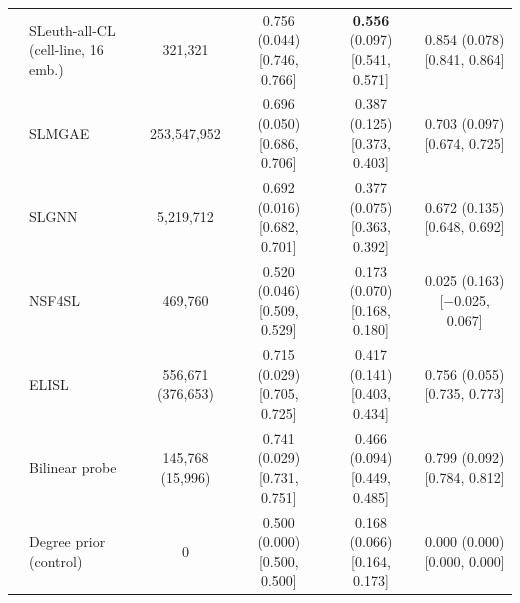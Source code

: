 \begin{tabular}{ll|cccc}
 & SLeuth-all-CL (cell-line, 16 emb.) & 321{,}321 & 0.756 (0.044) {\scriptsize [0.746, 0.766]} & \textbf{0.556} (0.097) {\scriptsize [0.541, 0.571]} & 0.854 (0.078) {\scriptsize [0.841, 0.864]} \\
 & SLMGAE & 253{,}547{,}952 & 0.696 (0.050) {\scriptsize [0.686, 0.706]} & 0.387 (0.125) {\scriptsize [0.373, 0.403]} & 0.703 (0.097) {\scriptsize [0.674, 0.725]} \\
 & SLGNN & 5{,}219{,}712 & 0.692 (0.016) {\scriptsize [0.682, 0.701]} & 0.377 (0.075) {\scriptsize [0.363, 0.392]} & 0.672 (0.135) {\scriptsize [0.648, 0.692]} \\
 & NSF4SL & 469{,}760 & 0.520 (0.046) {\scriptsize [0.509, 0.529]} & 0.173 (0.070) {\scriptsize [0.168, 0.180]} & 0.025 (0.163) {\scriptsize [$-$0.025, 0.067]} \\
 & ELISL & 556{,}671 (376{,}653) & 0.715 (0.029) {\scriptsize [0.705, 0.725]} & 0.417 (0.141) {\scriptsize [0.403, 0.434]} & 0.756 (0.055) {\scriptsize [0.735, 0.773]} \\
 & Bilinear probe & 145{,}768 (15{,}996) & 0.741 (0.029) {\scriptsize [0.731, 0.751]} & 0.466 (0.094) {\scriptsize [0.449, 0.485]} & 0.799 (0.092) {\scriptsize [0.784, 0.812]} \\
 & Degree prior (control) & 0 & 0.500 (0.000) {\scriptsize [0.500, 0.500]} & 0.168 (0.066) {\scriptsize [0.164, 0.173]} & 0.000 (0.000) {\scriptsize [0.000, 0.000]} \\
\hline
\end{tabular}
